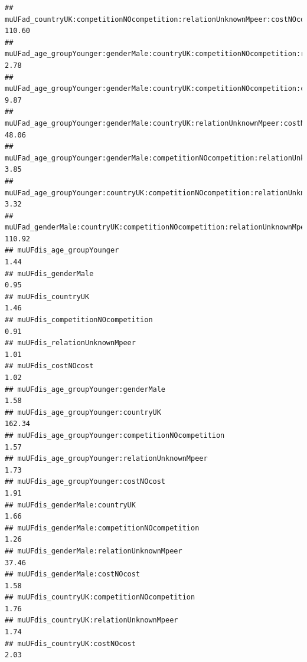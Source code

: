 \documentclass[
]{article}
\begin{document}
\begin{verbatim}
## muUFad_countryUK:competitionNOcompetition:relationUnknownMpeer:costNOcost                       110.60
## muUFad_age_groupYounger:genderMale:countryUK:competitionNOcompetition:relationUnknownMpeer        2.78
## muUFad_age_groupYounger:genderMale:countryUK:competitionNOcompetition:costNOcost                  9.87
## muUFad_age_groupYounger:genderMale:countryUK:relationUnknownMpeer:costNOcost                     48.06
## muUFad_age_groupYounger:genderMale:competitionNOcompetition:relationUnknownMpeer:costNOcost       3.85
## muUFad_age_groupYounger:countryUK:competitionNOcompetition:relationUnknownMpeer:costNOcost        3.32
## muUFad_genderMale:countryUK:competitionNOcompetition:relationUnknownMpeer:costNOcost            110.92
## muUFdis_age_groupYounger                                                                          1.44
## muUFdis_genderMale                                                                                0.95
## muUFdis_countryUK                                                                                 1.46
## muUFdis_competitionNOcompetition                                                                  0.91
## muUFdis_relationUnknownMpeer                                                                      1.01
## muUFdis_costNOcost                                                                                1.02
## muUFdis_age_groupYounger:genderMale                                                               1.58
## muUFdis_age_groupYounger:countryUK                                                              162.34
## muUFdis_age_groupYounger:competitionNOcompetition                                                 1.57
## muUFdis_age_groupYounger:relationUnknownMpeer                                                     1.73
## muUFdis_age_groupYounger:costNOcost                                                               1.91
## muUFdis_genderMale:countryUK                                                                      1.66
## muUFdis_genderMale:competitionNOcompetition                                                       1.26
## muUFdis_genderMale:relationUnknownMpeer                                                          37.46
## muUFdis_genderMale:costNOcost                                                                     1.58
## muUFdis_countryUK:competitionNOcompetition                                                        1.76
## muUFdis_countryUK:relationUnknownMpeer                                                            1.74
## muUFdis_countryUK:costNOcost                                                                      2.03

\end{verbatim}
\end{document}
